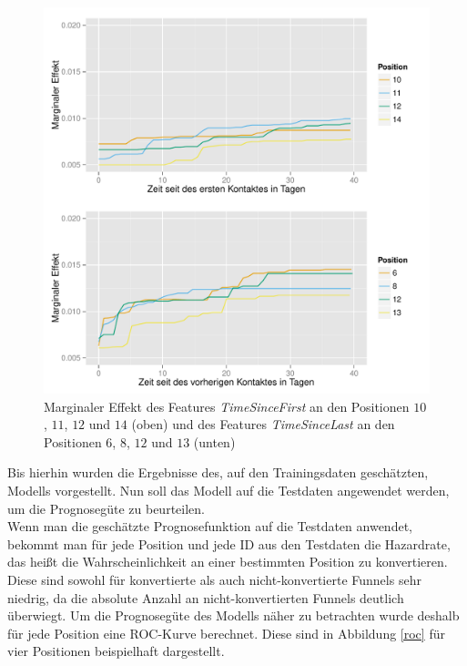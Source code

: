 \begin{figure}[H]
	\centering\includegraphics[scale=0.75]{marg_eff_time.pdf}\caption[Marginaler Effekt von \textit{TimeSinceFirst} und \textit{TimeSinceLast}]{Marginaler Effekt des Features \textit{TimeSinceFirst} an den Positionen $10$, $11$, $12$ und $14$ (oben) und des Features \textit{TimeSinceLast} an den Positionen $6$, $8$, $12$ und $13$ (unten)}\label{marg_eff_time}
\end{figure}
Bis hierhin wurden die Ergebnisse des, auf den Trainingsdaten geschätzten, Modells vorgestellt. Nun soll das Modell auf die Testdaten angewendet werden, um die Prognosegüte zu beurteilen.\\
Wenn man die geschätzte Prognosefunktion auf die Testdaten anwendet, bekommt man für jede Position und jede ID aus den Testdaten die Hazardrate, das heißt die Wahrscheinlichkeit an einer bestimmten Position zu konvertieren. Diese sind sowohl für konvertierte als auch nicht-konvertierte Funnels sehr niedrig, da die absolute Anzahl an nicht-konvertierten Funnels deutlich überwiegt. Um die Prognosegüte des Modells näher zu betrachten wurde deshalb für jede Position eine ROC-Kurve berechnet. Diese sind in Abbildung \ref{roc} für vier Positionen beispielhaft dargestellt.\\
